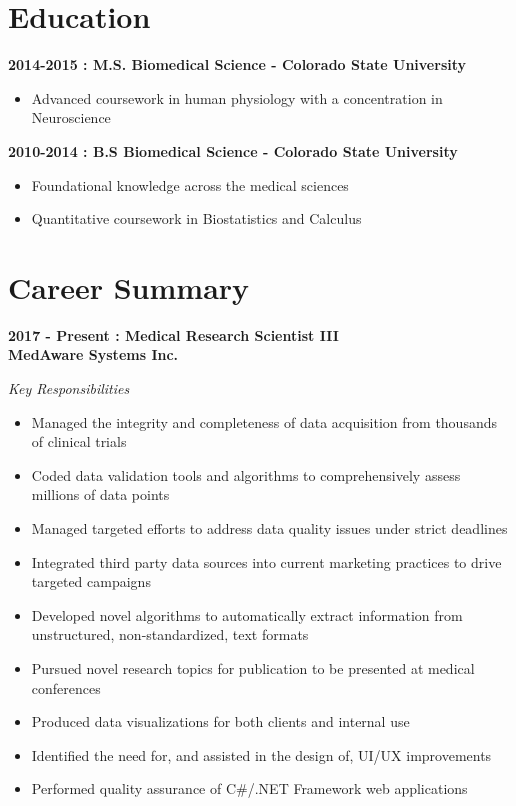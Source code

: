 \documentclass[11pt, a4paper]{awesome-cv}
\providecommand{\tightlist}{%
	\setlength{\itemsep}{0pt}\setlength{\parskip}{0pt}}
\begin{document}
\hypertarget{education}{%
\section{Education}\label{education}}

\textbf{2014-2015 : M.S. Biomedical Science - Colorado State University}

\begin{itemize}
\tightlist
\item
  Advanced coursework in human physiology with a concentration in Neuroscience
\end{itemize}

\textbf{2010-2014 : B.S Biomedical Science - Colorado State University}

\begin{itemize}
\tightlist
\item
  Foundational knowledge across the medical sciences
\item
  Quantitative coursework in Biostatistics and Calculus
\end{itemize}

\hypertarget{career-summary}{%
\section{Career Summary}\label{career-summary}}

\textbf{2017 - Present : Medical Research Scientist III}\\
\textbf{MedAware Systems Inc.}

\emph{Key Responsibilities}

\begin{itemize}
\tightlist
\item
  Managed the integrity and completeness of data acquisition from thousands of clinical trials
\item
  Coded data validation tools and algorithms to comprehensively assess millions of data points
\item
  Managed targeted efforts to address data quality issues under strict deadlines
\item
  Integrated third party data sources into current marketing practices to drive targeted campaigns
\item
  Developed novel algorithms to automatically extract information from unstructured, non-standardized, text formats
\item
  Pursued novel research topics for publication to be presented at medical conferences
\item
  Produced data visualizations for both clients and internal use
\item
  Identified the need for, and assisted in the design of, UI/UX improvements
\item
  Performed quality assurance of C\#/.NET Framework web applications
\end{itemize}
\end{document}

